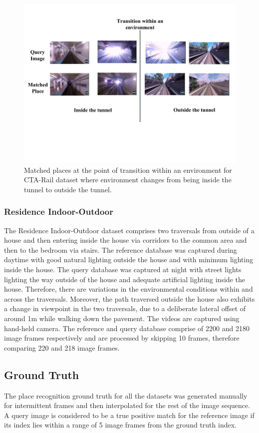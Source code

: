 \documentclass[letterpaper, 10 pt, conference]{ieeeconf}  %
\begin{document}
\begin{figure}
 \includegraphics[clip, trim=0.5cm 8cm 1cm 2.5cm,scale=0.25]{PlaceMatchesAtTransition}
 \caption{Matched places at the point of transition within an environment for CTA-Rail dataset where environment changes from being inside the tunnel to outside the tunnel.}
 \label{fig:placeMatches}
\end{figure}

\subsubsection{Residence Indoor-Outdoor}
The Residence Indoor-Outdoor dataset comprises two traversals from outside of a house and then entering inside the house via corridors to the common area and then to the bedroom via stairs. The reference database was captured during daytime with good natural lighting outside the house and with minimum lighting inside the house. The query database was captured at night with street lights lighting the way outside of the house and adequate artificial lighting inside the house. Therefore, there are variations in the environmental conditions within and across the traversals. Moreover, the path traversed outside the house also exhibits a change in viewpoint in the two traversals, due to a deliberate lateral offset of around 1m while walking down the pavement. The videos are captured using hand-held camera. The reference and query database comprise of 2200 and 2180 image frames respectively and are processed by skipping 10 frames, therefore comparing 220 and 218 image frames.

\subsection{Ground Truth}
The place recognition ground truth for all the datasets was generated manually for intermittent frames and then interpolated for the rest of the image sequence. A query image is considered to be a true positive match for the reference image if its index lies within a range of 5 image frames from the ground truth index.
\end{document}
